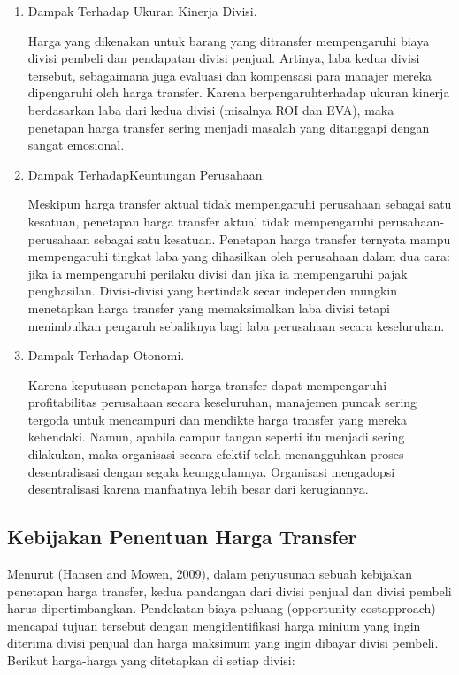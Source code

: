 \begin{enumerate}
	\item Dampak Terhadap Ukuran Kinerja Divisi.
	
	Harga yang dikenakan untuk barang yang ditransfer mempengaruhi biaya divisi pembeli dan pendapatan divisi penjual. Artinya, laba kedua divisi tersebut, sebagaimana juga evaluasi dan kompensasi para manajer mereka dipengaruhi oleh harga transfer. Karena berpengaruhterhadap ukuran kinerja berdasarkan laba dari kedua divisi (misalnya ROI dan EVA), maka penetapan harga transfer sering menjadi masalah yang ditanggapi dengan sangat emosional.

	\item Dampak TerhadapKeuntungan Perusahaan.
	
	Meskipun harga transfer aktual tidak mempengaruhi perusahaan sebagai satu kesatuan, penetapan harga transfer aktual tidak mempengaruhi perusahaan-perusahaan sebagai satu kesatuan. Penetapan harga transfer ternyata mampu mempengaruhi tingkat laba yang dihasilkan oleh perusahaan dalam dua cara: jika ia mempengaruhi perilaku divisi dan jika ia mempengaruhi pajak penghasilan. Divisi-divisi yang bertindak secar independen mungkin menetapkan harga transfer yang memaksimalkan laba divisi tetapi menimbulkan pengaruh sebaliknya bagi laba perusahaan secara keseluruhan.

	\item Dampak Terhadap Otonomi.
	
	Karena keputusan penetapan harga transfer dapat mempengaruhi profitabilitas perusahaan secara keseluruhan, manajemen puncak sering tergoda untuk mencampuri dan mendikte harga transfer yang mereka kehendaki. Namun, apabila campur tangan seperti itu menjadi sering dilakukan, maka organisasi secara efektif telah menangguhkan proses desentralisasi dengan segala keunggulannya. Organisasi mengadopsi desentralisasi karena manfaatnya lebih besar dari kerugiannya.
\end{enumerate}

\subsection{Kebijakan Penentuan Harga Transfer}

Menurut (Hansen and Mowen, 2009), dalam penyusunan sebuah kebijakan penetapan harga transfer, kedua pandangan dari divisi penjual dan divisi pembeli harus dipertimbangkan. Pendekatan biaya peluang (opportunity costapproach) mencapai tujuan tersebut dengan mengidentifikasi harga minium yang ingin diterima divisi penjual dan harga maksimum yang ingin dibayar divisi pembeli. Berikut harga-harga yang ditetapkan di setiap divisi:

